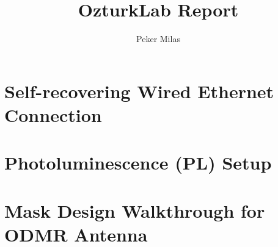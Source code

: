 \documentclass[letter,10pt,titlepage]{article}
\begin{document}
\title{OzturkLab Report}
\author{Peker Milas}
\maketitle

\tableofcontents
\newpage

\section{Self-recovering Wired Ethernet Connection}

 
\section{Photoluminescence (PL) Setup}


\section{Mask Design Walkthrough for ODMR Antenna}

\end{document}
